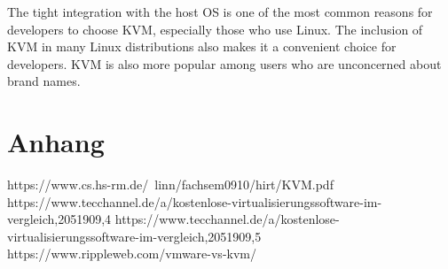 \documentclass[14pt]{extreport}
\begin{document}
The tight integration with the host OS is one of the most common reasons for developers to choose KVM, especially those who use Linux. The inclusion of KVM in many Linux distributions also makes it a convenient choice for developers. KVM is also more popular among users who are unconcerned about brand names.
\chapter{Anhang}
\printbibliography

https://www.cs.hs-rm.de/~linn/fachsem0910/hirt/KVM.pdf
https://www.tecchannel.de/a/kostenlose-virtualisierungssoftware-im-vergleich,2051909,4
https://www.tecchannel.de/a/kostenlose-virtualisierungssoftware-im-vergleich,2051909,5
https://www.rippleweb.com/vmware-vs-kvm/
\end{document}
